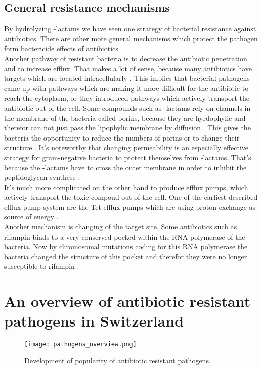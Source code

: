 \subsection{General resistance mechanisms}
\label{section:resistance_mechanisms}
By hydrolyzing \textbeta-lactams we have seen one strategy of bacterial resistance against antibiotics. There are other more general mechanisms which protect the pathogen form bactericide effects of antibiotics. \\
Another pathway of resistant bacteria is to decrease the antibiotic penetration and to increase efflux. That makes a lot of sense, because many antibiotics have targets which are located intracellularly \cite{munita_mechanisms_2016}. This implies that bacterial pathogens came up with pathways which are making it more difficult for the antibiotic to reach the cytoplasm, or they introduced pathways which actively transport the antibiotic out of the cell. Some compounds such as \textbeta-lactams rely on channels in the membrane of the bacteria called porins, because they are hyrdophylic and therefor can not just pass the lipophylic membrane by diffusion \cite{munita_mechanisms_2016}. This gives the bacteria the opportunity to reduce the numbers of porins or to change their structure \cite{munita_mechanisms_2016}. It's noteworthy that changing permeability is an especially effective strategy for gram-negative bacteria to protect themselves from \textbeta-lactams. That's because the \textbeta-lactams have to cross the outer membrane in order to inhibit the peptidoglycan synthese \cite{munita_mechanisms_2016}. \\
It's much more complicated on the other hand to produce efflux pumps, which actively transport the toxic compoud out of the cell. One of the earliest described efllux pump system are the Tet efflux pumps which are using proton exchange as source of energy \cite{munita_mechanisms_2016}.\\
Another mechanism is changing of the target site. Some antibiotics such as rifampin binds to a very conserved pocked within the RNA polymerase of the bacteria. Now by chromosomal mutations coding for this RNA polymerase the bacteria changed the structure of this pocket and therefor they were no longer susceptible to rifampin \cite{munita_mechanisms_2016}.    

\section{An overview of antibiotic resistant pathogens in Switzerland}
\begin{figure}
	\texttt{[image: pathogens\_overview.png]}
	\caption{Development of popularity of antibiotic resistant pathogens.
		\cite{swiss_hospitals_pathogens}}
	\label{figure:pathogen_dvelopment}
\end{figure}

